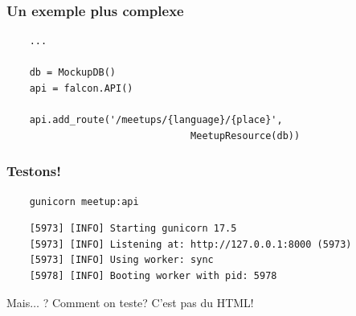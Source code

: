 \documentclass[10pt, compress]{beamer}
\begin{document}
\begin{frame}[fragile]
	\frametitle{Un exemple plus complexe}
    
    \begin{verbatim}
    ...
    
    db = MockupDB()
    api = falcon.API()
    
    api.add_route('/meetups/{language}/{place}', 
                                MeetupResource(db))
    \end{verbatim}
\end{frame}
\begin{frame}[fragile]
	\frametitle{Testons!}
	
	\begin{verbatim}
	gunicorn meetup:api
	\end{verbatim}
	\pause
	\begin{verbatim}
	[5973] [INFO] Starting gunicorn 17.5
	[5973] [INFO] Listening at: http://127.0.0.1:8000 (5973)
	[5973] [INFO] Using worker: sync
	[5978] [INFO] Booting worker with pid: 5978
	\end{verbatim}
	
	\pause
	Mais$\ldots$ ? Comment on teste? C'est pas du HTML!
	
\end{frame}

\end{document}
